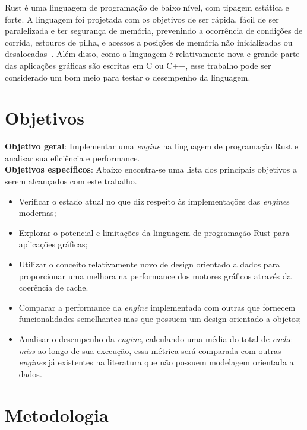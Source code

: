 \documentclass[11pt]{article}
\begin{document}
Rust é uma linguagem de programação de baixo nível, com tipagem estática e forte. A linguagem foi projetada com os objetivos 
de ser rápida, fácil de ser paralelizada e ter segurança de memória, prevenindo a ocorrência de condições de corrida, estouros 
de pilha, e acessos a posições de memória não inicializadas ou desalocadas~\cite{Matsakis:2014:RL:2692956.2663188}. Além disso, 
como a linguagem é relativamente nova e grande parte das aplicações gráficas são escritas em C ou C++, esse trabalho pode ser 
considerado um bom meio para testar o desempenho da linguagem.

\section{Objetivos}
\label{obj}

\textbf{Objetivo geral}: Implementar uma \textit{engine} na linguagem de programação Rust e analisar sua eficiência e performance.\\

\noindent\textbf{Objetivos específicos}: 
Abaixo encontra-se uma lista dos principais objetivos a serem alcançados com este trabalho.
\begin{itemize}
    \item Verificar o estado atual no que diz respeito às implementações das \textit{engine}s modernas;
    \item Explorar o potencial e limitações da linguagem de programação Rust para aplicações gráficas;
    \item Utilizar o conceito relativamente novo de design orientado a dados para proporcionar uma melhora
        na performance dos motores gráficos através da coerência de cache.
    \item Comparar a performance da \textit{engine} implementada com outras que fornecem funcionalidades semelhantes mas
        que possuem um design orientado a objetos;
    \item Analisar o desempenho da \textit{engine}, calculando uma média do total de \textit{cache miss} ao longo de sua 
        execução, essa métrica será comparada com outras \textit{engines} já existentes na literatura que não possuem 
        modelagem orientada a dados.
\end{itemize}

\section{Metodologia}
\label{met}
\end{document}
